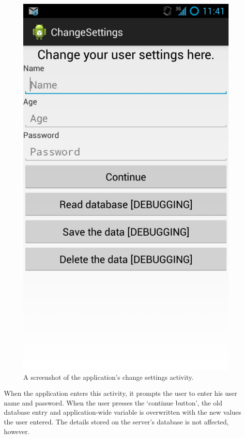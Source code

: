 \begin{figure}
 \centering 
 \includegraphics[clip = true, trim = 0 320 0 60,
 scale=0.2]{change_settings}
 \caption{A screenshot of the application's change settings activity.}
 \label{fig:change-settings-screenshot}
\end{figure}

When the application enters this activity, it prompts the user to enter his user
name and password. When the user presses the `continue button', the old database
entry and application-wide variable is overwritten with the new values the user entered.
The details stored on the server's database is not affected, however.

